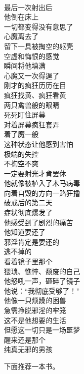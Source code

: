 \begin{poem}[邪淫半兽人]
    \begin{multicols}{3}
        \begin{center}~\\
            最后一次射出后 \\ 他倒在床上 \\ 一切都变得没有意思了 \\ 心魔离去了 \\ 留下一具被掏空的躯壳 \\ 空虚和悔恨的感觉 \\ 瞬间将他填满 \\ 心魔又一次得逞了 \\ 刚才的疯狂历历在目 \\ 疯狂找黄、疯狂看黄 \\ 两只禽兽般的眼睛 \\ 死死盯住屏幕 \\ 对着屏幕疯狂套弄 \\ 着了魔一般 \\ 这种状态让他感到害怕 \\ 极端的失控 \\ 不掏空不爽 \\ 一定要射光才肯罢休 \\ 他就像被植入了木马病毒 \\ 向着自毁的方向一路狂撸 \\ 破戒后的第二天 \\ 症状彻底爆发了 \\ 他感受到了剧烈的痛苦 \\ 他知道要还了 \\ 邪淫肯定是要还的 \\ 逃不掉的 \\ 看着镜子里那个 \\ 猥琐、憔悴、颓废的自己 \\ 他怒吼一声，砸碎了镜子 \\ 他说：“我彻底受够了！” \\ 他像一只烦躁的困兽 \\ 急需挣脱邪淫的牢笼 \\ 这不是他想要的生活 \\ 但愿这一切只是一场噩梦 \\ 醒来还是那个 \\ 纯真无邪的男孩
        \end{center}
    \end{multicols}
\end{poem}

下面推荐一本书。

